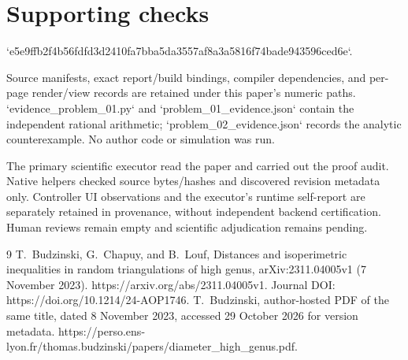 \documentclass[10pt]{article}
\begin{document}
\section*{Supporting checks}
`e5e9ffb2f4b56fdfd3d2410fa7bba5da3557af8a3a5816f74bade943596ced6e`.\par
Source manifests, exact report/build bindings, compiler dependencies, and per-page render/view records are retained under this paper’s numeric paths. `evidence\_problem\_01.py` and `problem\_01\_evidence.json` contain the independent rational arithmetic; `problem\_02\_evidence.json` records the analytic counterexample. No author code or simulation was run.\par
The primary scientific executor read the paper and carried out the proof audit. Native helpers checked source bytes/hashes and discovered revision metadata only. Controller UI observations and the executor’s runtime self-report are separately retained in provenance, without independent backend certification. Human reviews remain empty and scientific adjudication remains pending.\par
9 T. Budzinski, G. Chapuy, and B. Louf, Distances and isoperimetric inequalities in random triangulations of high genus, arXiv:2311.04005v1 (7 November 2023). https://arxiv.org/abs/2311.04005v1. Journal DOI: https://doi.org/10.1214/24-AOP1746. T. Budzinski, author-hosted PDF of the same title, dated 8 November 2023, accessed 29 October 2026 for version metadata. https://perso.ens-lyon.fr/thomas.budzinski/papers/diameter\_high\_genus.pdf.\par
\end{document}
